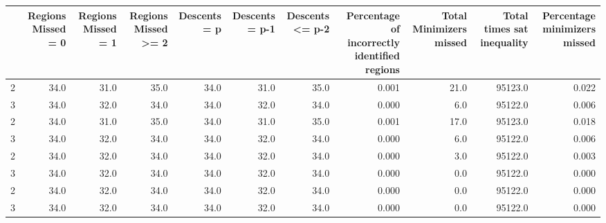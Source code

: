 \begin{tabular}{lrrrrrrrrrr}
\toprule
{} &  Regions Missed = 0 &  Regions Missed = 1 &  Regions Missed >= 2 &  Descents = p &  Descents = p-1 &  Descents <= p-2 &  Percentage of incorrectly identified regions &  Total Minimizers missed &  Total times sat inequality &  Percentage minimizers missed \\
\midrule
2 &                34.0 &                31.0 &                 35.0 &          34.0 &            31.0 &             35.0 &                                         0.001 &                     21.0 &                     95123.0 &                         0.022 \\
3 &                34.0 &                32.0 &                 34.0 &          34.0 &            32.0 &             34.0 &                                         0.000 &                      6.0 &                     95122.0 &                         0.006 \\
2 &                34.0 &                31.0 &                 35.0 &          34.0 &            31.0 &             35.0 &                                         0.001 &                     17.0 &                     95123.0 &                         0.018 \\
3 &                34.0 &                32.0 &                 34.0 &          34.0 &            32.0 &             34.0 &                                         0.000 &                      6.0 &                     95122.0 &                         0.006 \\
2 &                34.0 &                32.0 &                 34.0 &          34.0 &            32.0 &             34.0 &                                         0.000 &                      3.0 &                     95122.0 &                         0.003 \\
3 &                34.0 &                32.0 &                 34.0 &          34.0 &            32.0 &             34.0 &                                         0.000 &                      0.0 &                     95122.0 &                         0.000 \\
2 &                34.0 &                32.0 &                 34.0 &          34.0 &            32.0 &             34.0 &                                         0.000 &                      0.0 &                     95122.0 &                         0.000 \\
3 &                34.0 &                32.0 &                 34.0 &          34.0 &            32.0 &             34.0 &                                         0.000 &                      0.0 &                     95122.0 &                         0.000 \\
\bottomrule
\end{tabular}
